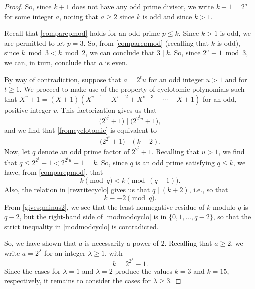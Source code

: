 \documentclass[12pt]{article}
\begin{document}
\begin{proof}
 So, since $k + 1$ does not have any odd prime divisor, we 
 write $k + 1 = 2^{a}$ for some integer $a$, noting that $a \geq 2$ since $k$ is odd and since $ k > 1$. 

 Recall that \eqref{comparepmod} holds for an odd prime $p \leq k$. 
 Since $k > 1$ is odd, we are permitted to let $p = 3$. 
 So, from \eqref{comparepmod} (recalling that $k$ is odd), 
 since $k \bmod {3} < k \bmod {2}$, 
 we can conclude that $3 \mid k$.
 So, since
 $2^{a} \equiv 1 \bmod 3$, we can, in turn, conclude that 
 $a$ is even. 

 By way of contradiction, suppose that $a = 2^{t} u$ for an odd integer $u > 1$ and for $t \geq 1$. 
 We proceed to make use of the property of cyclotomic polynomials
 such that $X^{v} + 1 = (X+1)(X^{v - 1} - X^{v - 2} + X^{v-3} - \cdots - X + 1)$ for an odd, positive integer $v$. 
 This factorization gives us that 
\begin{equation}\label{fromcyclotomic} 
 \big( 2^{2^{t}} + 1 \big) \mid \big( 2^{2^{t} u} + 1 \big), 
\end{equation}
 and we find that \eqref{fromcyclotomic} is equivalent to 
\begin{equation}\label{rewritecyclo}
 \big( 2^{2^{t}} + 1 \big) \mid \left( k + 2 \right). 
\end{equation}
 Now, let $q$ denote an odd prime factor of $2^{2^{t}} + 1$. Recalling that $u > 1$, we find that $q \leq 2^{2^{t}} + 1 < 2^{2^{t} u} - 
 1 = k$. So, since $q$ is an odd prime satisfying $q \leq k$, we have, from \eqref{comparepmod}, that 
\begin{equation}\label{modmodcyclo}
 k \pmod {q} < k \pmod {(q-1)}. 
\end{equation}
 Also, the relation in 
 \eqref{rewritecyclo} gives us that $q \mid (k+2)$, i.e., so that 
\begin{equation}\label{givesqminus2} 
 k \equiv -2 \pmod {q}. 
\end{equation}
 From \eqref{givesqminus2}, we see that the least nonnegative residue of $k$ modulo $q$
 is $q-2$, but the right-hand side of 
 \eqref{modmodcyclo} is in $\{ 0, 1, \ldots, q - 2 \}$, 
 so that the strict inequality in 	 \eqref{modmodcyclo} is contradicted. 

 So, we have shown that $a$ is necessarily a power of $2$. 
 Recalling that $a \geq 2$, we write $a = 2^{\lambda}$ for an integer $\lambda \geq 1$, with 
\begin{equation}\label{kpowertower} 
 k = 2^{2^{\lambda}} - 1.
\end{equation} 
 Since the cases for $\lambda = 1$ and $\lambda = 2$  produce the values $k = 3$ and $k = 15$, respectively,   it remains to consider the  
  cases for $\lambda \geq 3$. 


\end{proof}
\end{document}
